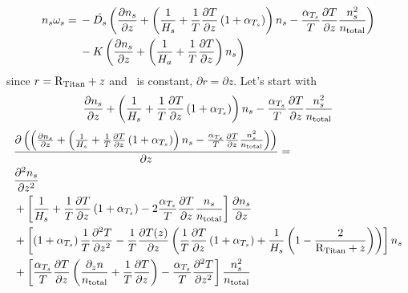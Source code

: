 \begin{equation}
\begin{split}
n_s\omega_s = &\: -\tilde{D_s} 
                        \left(\frac{\partial n_s}{\partial z} + \left(\frac{1}{H_s} + 
                                \frac{1}{T}\frac{\partial T}{\partial z}\left( 1 + \alpha_{T_s}\right)\right)n_s
                                - \frac{\alpha_{T_s}}{T}\frac{\partial T}{\partial z}\frac{n_s^2}{n_\text{total}}\right) \\
                  &\: - K \left(\frac{\partial n_s}{\partial z} + \left(\frac{1}{H_a} + \frac{1}{T}\frac{\partial T}{\partial z}\right)n_s\right)
\end{split}
\end{equation}
since $r = \text{R}_\text{Titan} + z$ and \RTitan\ is constant, $\partial r = \partial z$.
Let's start with 
\[
\frac{\partial n_s}{\partial z} + \left(\frac{1}{H_s} + 
                                \frac{1}{T}\frac{\partial T}{\partial z}\left(1 + \alpha_{T_s}\right)\right)n_s
                                - \frac{\alpha_{T_s}}{T}\frac{\partial T}{\partial z}\frac{n_s^2}{n_\text{total}}
\]
\begin{equation}
\begin{split}
& \frac{\partial\left(\left(\frac{\partial n_s}{\partial z}
                       + \left(\frac{1}{H_s} + \frac{1}{T}\frac{\partial T}{\partial z}\left(1 + \alpha_{T_s}\right)\right)n_s
                       - \frac{\alpha_{T_s}}{T}\frac{\partial T}{\partial z}\frac{n_s^2}{n_\text{total}}\right)\right)}{\partial z}
=  \\
  & \frac{\partial^2n_s}{\partial{z}^2} \\
  & + \left[\frac{1}{H_s}
            + \frac{1}{T}\frac{\partial T}{\partial z}\left(1 + \alpha_{T_s}\right)
            - 2 \frac{\alpha_{T_s}}{T}\frac{\partial T}{\partial z}\frac{n_s}{n_\text{total}}
     \right]\frac{\partial n_s}{\partial z} \\
  & + \left[\left(1 + \alpha_{T_s}\right)\frac{1}{T}\frac{\partial^2T}{\partial{z}^2} 
                   - \frac{1}{T}\frac{\partial T(z)}{\partial z}
                        \left(\frac{1}{T}\frac{\partial T}{\partial z}\left(1 + \alpha_{T_s}\right)
                              + \frac{1}{H_s}
                                        \left(1 - \frac{2}{\text{R}_\text{Titan} + z}\right)
                        \right)
            \right]n_s \\
  & + \left[\frac{\alpha_{T_s}}{T}\frac{\partial T}{\partial z}\left(
                \frac{\partial_{z}{n}}{n_\text{total}}
                + \frac{1}{T}\frac{\partial T}{\partial z}\right)
      - \frac{\alpha_{T_s}}{T}\frac{\partial^2T}{\partial{z}^2}\right]\frac{n_s^2}{n_\text{total}}\\
\end{split}
\label{Titan:diff_deriv_D_fac}
\end{equation}
